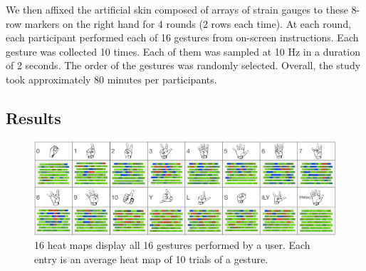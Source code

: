 \documentclass{sigchi}
\begin{document}
We then affixed the artificial skin composed of arrays of strain gauges to these 8-row markers on the right hand for 4 rounds (2 rows each time). 
At each round, each participant performed each of 16 gestures from on-screen instructions. Each gesture was collected 10 times. Each of them was sampled at 10 Hz in a duration of 2 seconds.
The order of the gestures was randomly selected. 
Overall, the study took approximately 80 minutes per participants.

\subsection{Results}

\begin{figure}
 \begin{center}
  \includegraphics[width=2\columnwidth]{figures/user16GesturesSV.pdf}
  \caption{ 16 heat maps display all 16 gestures performed by a user. Each entry is an average heat map of 10 trials of a gesture.
  }
  \label{fig:user16GesturesSV}
  \end{center}
\end{figure}

\end{document}

